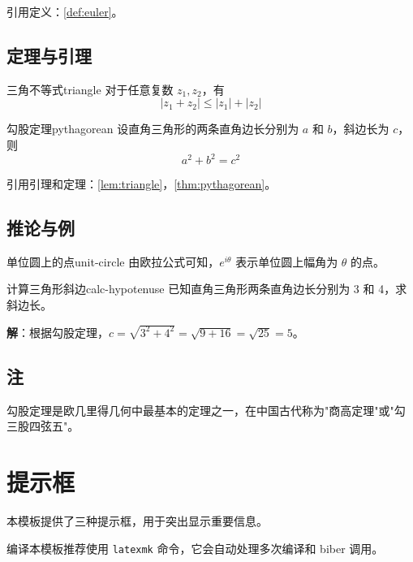 引用定义：\cref{def:euler}。

\subsection{定理与引理}

\begin{lemma}{三角不等式}{triangle}
    对于任意复数 $z_1, z_2$，有
    \[ |z_1 + z_2| \leq |z_1| + |z_2| \]
\end{lemma}

\begin{theorem}{勾股定理}{pythagorean}
    设直角三角形的两条直角边长分别为 $a$ 和 $b$，斜边长为 $c$，则
    \[ a^2 + b^2 = c^2 \]
\end{theorem}

引用引理和定理：\cref{lem:triangle}，\cref{thm:pythagorean}。

\subsection{推论与例}

\begin{corollary}{单位圆上的点}{unit-circle}
    由欧拉公式可知，$e^{i\theta}$ 表示单位圆上幅角为 $\theta$ 的点。
\end{corollary}

\begin{example}{计算三角形斜边}{calc-hypotenuse}
    已知直角三角形两条直角边长分别为 3 和 4，求斜边长。

    \textbf{解}：根据勾股定理，$c = \sqrt{3^2 + 4^2} = \sqrt{9 + 16} = \sqrt{25} = 5$。
\end{example}

\subsection{注}

\begin{remark}
    勾股定理是欧几里得几何中最基本的定理之一，在中国古代称为"商高定理"或"勾三股四弦五"。
\end{remark}

\section{提示框}

本模板提供了三种提示框，用于突出显示重要信息。

\begin{tipbox}
    编译本模板推荐使用 \texttt{latexmk} 命令，它会自动处理多次编译和 biber 调用。
\end{tipbox}

